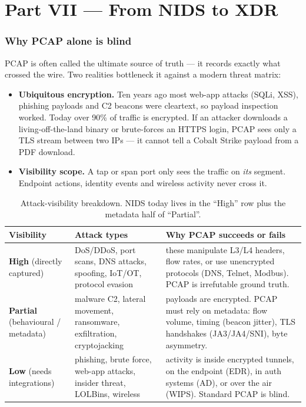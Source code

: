 \documentclass[11pt,a4paper]{article}
\begin{document}
\clearpage
\part*{Part VII --- From NIDS to XDR}

\section{Why PCAP alone is blind}

PCAP is often called the ultimate source of truth --- it records exactly what
crossed the wire. Two realities bottleneck it against a modern threat matrix:

\begin{itemize}
\item \textbf{Ubiquitous encryption.} Ten years ago most web-app attacks (SQLi,
  XSS), phishing payloads and C2 beacons were cleartext, so payload inspection
  worked. Today over 90\% of traffic is encrypted. If an attacker downloads a
  living-off-the-land binary or brute-forces an HTTPS login, PCAP sees only a
  TLS stream between two IPs --- it cannot tell a Cobalt Strike payload from a
  PDF download.
\item \textbf{Visibility scope.} A tap or span port only sees the traffic on
  \emph{its} segment. Endpoint actions, identity events and wireless activity
  never cross it.
\end{itemize}

\begin{table}[H]\centering\small
\begin{tabular}{@{}p{2.6cm}p{5.4cm}p{6.3cm}@{}}
\toprule
\textbf{Visibility} & \textbf{Attack types} & \textbf{Why PCAP succeeds or fails} \\
\midrule
\textbf{High} (directly captured) & DoS/DDoS, port scans, DNS attacks, spoofing,
  IoT/OT, protocol evasion & these manipulate L3/L4 headers, flow rates, or use
  unencrypted protocols (DNS, Telnet, Modbus). PCAP is irrefutable ground truth. \\
\textbf{Partial} (behavioural / metadata) & malware C2, lateral movement,
  ransomware, exfiltration, cryptojacking & payloads are encrypted. PCAP must
  rely on metadata: flow volume, timing (beacon jitter), TLS handshakes
  (JA3/JA4/SNI), byte asymmetry. \\
\textbf{Low} (needs integrations) & phishing, brute force, web-app attacks,
  insider threat, LOLBins, wireless & activity is inside encrypted tunnels, on
  the endpoint (EDR), in auth systems (AD), or over the air (WIPS). Standard PCAP
  is blind. \\
\bottomrule
\end{tabular}
\caption{Attack-visibility breakdown. NIDS today lives in the ``High'' row plus
the metadata half of ``Partial''.}
\end{table}
\end{document}
